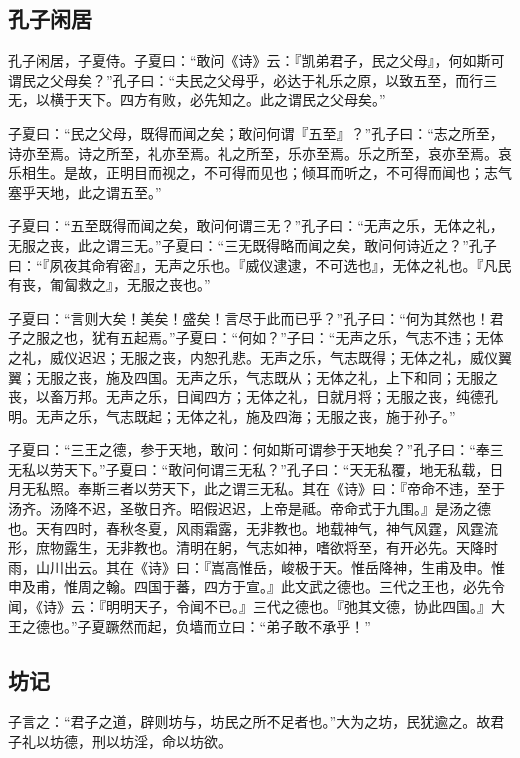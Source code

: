 \documentclass[]{article}
\begin{document}
\hypertarget{header-n687}{%
\subsection{孔子闲居}\label{header-n687}}

孔子闲居，子夏侍。子夏曰：``敢问《诗》云：『凯弟君子，民之父母』，何如斯可谓民之父母矣？''孔子曰：``夫民之父母乎，必达于礼乐之原，以致五至，而行三无，以横于天下。四方有败，必先知之。此之谓民之父母矣。''

子夏曰：``民之父母，既得而闻之矣；敢问何谓『五至』？''孔子曰：``志之所至，诗亦至焉。诗之所至，礼亦至焉。礼之所至，乐亦至焉。乐之所至，哀亦至焉。哀乐相生。是故，正明目而视之，不可得而见也；倾耳而听之，不可得而闻也；志气塞乎天地，此之谓五至。''

子夏曰：``五至既得而闻之矣，敢问何谓三无？''孔子曰：``无声之乐，无体之礼，无服之丧，此之谓三无。''子夏曰：``三无既得略而闻之矣，敢问何诗近之？''孔子曰：``『夙夜其命宥密』，无声之乐也。『威仪逮逮，不可选也』，无体之礼也。『凡民有丧，匍匐救之』，无服之丧也。''

子夏曰：``言则大矣！美矣！盛矣！言尽于此而已乎？''孔子曰：``何为其然也！君子之服之也，犹有五起焉。''子夏曰：``何如？''子曰：``无声之乐，气志不违；无体之礼，威仪迟迟；无服之丧，内恕孔悲。无声之乐，气志既得；无体之礼，威仪翼翼；无服之丧，施及四国。无声之乐，气志既从；无体之礼，上下和同；无服之丧，以畜万邦。无声之乐，日闻四方；无体之礼，日就月将；无服之丧，纯德孔明。无声之乐，气志既起；无体之礼，施及四海；无服之丧，施于孙子。''

子夏曰：``三王之德，参于天地，敢问：何如斯可谓参于天地矣？''孔子曰：``奉三无私以劳天下。''子夏曰：``敢问何谓三无私？''孔子曰：``天无私覆，地无私载，日月无私照。奉斯三者以劳天下，此之谓三无私。其在《诗》曰：『帝命不违，至于汤齐。汤降不迟，圣敬日齐。昭假迟迟，上帝是祗。帝命式于九围。』是汤之德也。天有四时，春秋冬夏，风雨霜露，无非教也。地载神气，神气风霆，风霆流形，庶物露生，无非教也。清明在躬，气志如神，嗜欲将至，有开必先。天降时雨，山川出云。其在《诗》曰：『嵩高惟岳，峻极于天。惟岳降神，生甫及申。惟申及甫，惟周之翰。四国于蕃，四方于宣。』此文武之德也。三代之王也，必先令闻，《诗》云：『明明天子，令闻不已。』三代之德也。『弛其文德，协此四国。』大王之德也。''子夏蹶然而起，负墙而立曰：``弟子敢不承乎！''

\hypertarget{header-n695}{%
\subsection{坊记}\label{header-n695}}

子言之：``君子之道，辟则坊与，坊民之所不足者也。''大为之坊，民犹逾之。故君子礼以坊德，刑以坊淫，命以坊欲。
\end{document}
